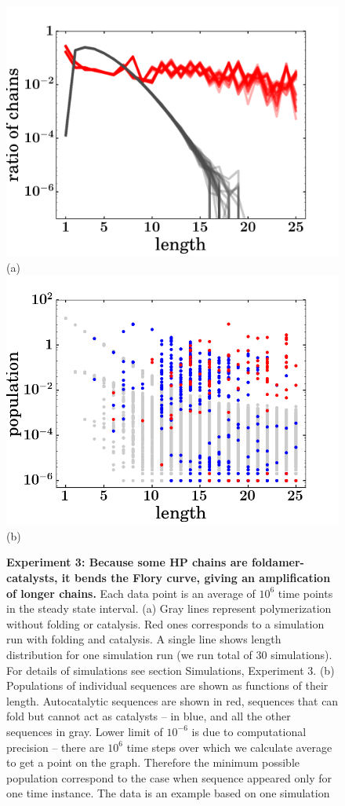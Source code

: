 \documentclass[journal=jacsat,manuscript=article,layout=twocolumn]{achemso}
\begin{document}
\begin{figure}[htb!]
  \centering
  \includegraphics[width=0.9\columnwidth]{pictures/distrHP-plain-many.pdf}(a) 
  \includegraphics[width=0.9\columnwidth]{pictures/scatter1837.png}(b) 
  \caption{\footnotesize{\textbf{Experiment 3: Because some HP chains are foldamer-catalysts, it 
bends the Flory curve, giving an amplification of longer chains.}  Each data point is an average 
of 
$10^6$ time points in the steady state interval. (a) Gray lines represent polymerization without 
folding or catalysis. Red ones corresponds to a simulation run with folding and catalysis. A single 
line shows length distribution for one simulation run (we run total of 30 simulations). For details 
of simulations see section Simulations, Experiment 3. (b) Populations of individual sequences are 
shown as 
functions of their length. Autocatalytic sequences are shown in red, sequences that can fold but 
cannot act as  catalysts -- in blue, and all the other sequences in gray. Lower limit of $10^{-6}$ 
is due to computational precision -- there are $10^6$ time steps over which we calculate average to 
get a point on the graph. Therefore the minimum possible population correspond to the case when 
sequence appeared only for one time instance. The data is an example based on one simulation}}
  \label{fig:stats-scatter-018}
\end{figure}
\end{document}
